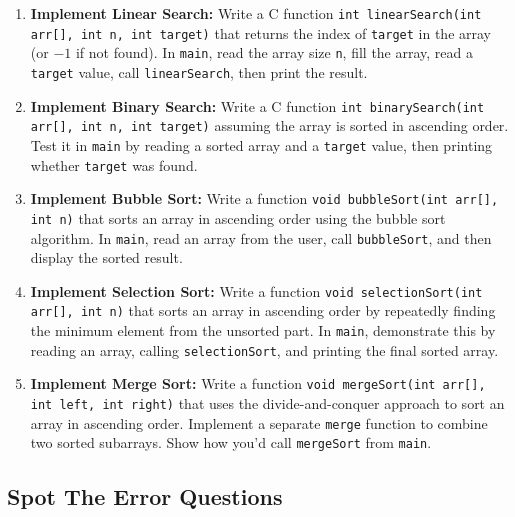 \documentclass[a4paper,12pt]{article}
\begin{document}
\begin{enumerate}
  \item \textbf{Implement Linear Search:}  
  Write a C function \texttt{int linearSearch(int arr[], int n, int target)} that returns the index of \texttt{target} in the array (or \(-1\) if not found). In \texttt{main}, read the array size \texttt{n}, fill the array, read a \texttt{target} value, call \texttt{linearSearch}, then print the result.

  \item \textbf{Implement Binary Search:}  
  Write a C function \texttt{int binarySearch(int arr[], int n, int target)} assuming the array is sorted in ascending order. Test it in \texttt{main} by reading a sorted array and a \texttt{target} value, then printing whether \texttt{target} was found.

  \item \textbf{Implement Bubble Sort:}  
  Write a function \texttt{void bubbleSort(int arr[], int n)} that sorts an array in ascending order using the bubble sort algorithm. In \texttt{main}, read an array from the user, call \texttt{bubbleSort}, and then display the sorted result.

  \item \textbf{Implement Selection Sort:}  
  Write a function \texttt{void selectionSort(int arr[], int n)} that sorts an array in ascending order by repeatedly finding the minimum element from the unsorted part. In \texttt{main}, demonstrate this by reading an array, calling \texttt{selectionSort}, and printing the final sorted array.

  \item \textbf{Implement Merge Sort:}  
  Write a function \texttt{void mergeSort(int arr[], int left, int right)} that uses the divide-and-conquer approach to sort an array in ascending order. Implement a separate \texttt{merge} function to combine two sorted subarrays. Show how you’d call \texttt{mergeSort} from \texttt{main}.
\end{enumerate}

\newpage

\subsection{Spot The Error Questions}
\end{document}
